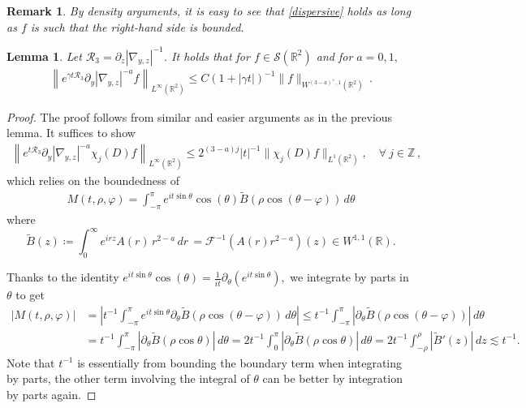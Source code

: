 \documentclass[11pt,reqno]{article}
\newcommand{\beqs}{\begin{equation*}}
\newcommand{\eeqs}{\end{equation*}}
\newtheorem{lemm}[theo]{Lemma}
\newtheorem{rema}[theo]{Remark}
\numberwithin{equation}{section}
\newcommand\R{{\mathbb R}}
\newcommand \tri {\coloneqq}
\let\pa=\partial
\begin{document}
\begin{appendices}
\begin{rema}
    By density arguments, it is easy to see that \eqref{dispersive} holds as long as 
    $f$ is such that the right-hand side is bounded.
\end{rema}
\begin{lemm}\label{App-dis-2}
	Let $\mathcal{R}_3=\pa_z|\nabla_{y,z}|^{-1}$.
  It holds that for  $f\in \mathcal{S}(\R^2)$ and
    for $a=0,1,$
	\begin{align}\label{dispersive-improved}
		\left\| e^{\gamma t\mathcal{R}_3}\pa_y |\nabla_{y,z}|^{-a} f \right\|_{L^\infty(\mathbb{R}^2)} \leq C (1+|\gamma t|)^{-1} \|f\|_{W^{(3-a)^{+},1}(\mathbb{R}^2)}\,.
	\end{align}
\end{lemm}
\begin{proof}
	The proof follows from similar and easier arguments as in the previous lemma. 
	It suffices to show 
    \begin{align}\label{dispes-pj-pay}
		\left\| e^{t\mathcal{R}_3}\pa_y |\nabla_{y,z}|^{-a} \chi_j(D)f \right\|_{L^\infty(\mathbb{R}^2)} \leq 2^{(3-a)j}|t|^{-1} \|\chi_j(D)f\|_{L^1(\mathbb{R}^2)}, \quad \forall~ j\in \mathbb{Z}\, ,
	\end{align}
which relies on the boundedness of 
	\begin{align*}
		M(t,\rho,\varphi)=  \int_{-\pi}^{\pi} e^{i t \sin \theta}\cos (\theta) \tilde{B}({\rho}\cos (\theta-\varphi)) \, d\theta 
	\end{align*}
	where 
	\beqs
	\tilde{B}(z)\tri \int_0^\infty e^{i r 
		z} A(r) \, r^{2-a} \, dr\,=\mathcal{F}^{-1}(A(r) r^{2-a})(z)\in W^{1,1}(\R).
	\eeqs
	
	
	Thanks to the identity $e^{i t \sin \theta}\cos (\theta) =\frac{1}{it}\pa_{\theta} (e^{i t \sin \theta}),$ we integrate by parts in $\theta$ to get
	\begin{align*}
		|M(t,\rho,\varphi)|&=\left|t^{-1}\int_{-\pi}^{\pi} e^{i t \sin \theta}\pa_{\theta}\tilde{B}({\rho}\cos (\theta-\varphi)) \, d\theta\right|\leq t^{-1}\int_{-\pi}^{\pi} |\pa_{\theta}\tilde{B}({\rho}\cos (\theta-\varphi))| \, d\theta\\&= t^{-1}\int_{-\pi}^{\pi} |\pa_{\theta}\tilde{B}({\rho}\cos \theta)| \, d\theta=2t^{-1}\int_{0}^{\pi} |\pa_{\theta}\tilde{B}({\rho}\cos \theta)| \, d\theta=2t^{-1}\int_{-{\rho}}^{{\rho}} |\tilde{B}'(z)| \, dz\lesssim t^{-1}.
	\end{align*}
	Note that  $t^{-1}$ is essentially from bounding the 
	boundary term when integrating by parts, the other term involving the integral of $\theta$ can be better by integration by parts again.
	

\end{proof}
\end{appendices}
\end{document}
